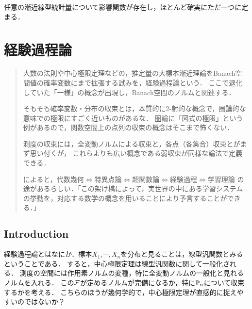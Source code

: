 \documentclass[uplatex,dvipdfmx]{jsreport}
\begin{document}
\begin{theorem}
    任意の漸近線型統計量について影響関数が存在し，ほとんど確実にただ一つに定まる．
\end{theorem}

\chapter{経験過程論}

\begin{quotation}
    大数の法則や中心極限定理などの，推定量の大標本漸近理論をBanach空間値の確率変数にまで拡張する試みを，経験過程論という．
    ここで退化していた「一様」の概念が出現し，Banach空間のノルムと関連する．

    そもそも確率変数・分布の収束とは，本質的に2-射的な概念で，圏論的な意味での極限にすごく近いものがあるな．
    圏論に「図式の極限」という例があるので，関数空間上の点列の収束の概念はそこまで怖くない．

    測度の収束には，全変動ノルムによる収束と，各点（各集合）収束とがまず思い付くが，
    これらよりも広い概念である弱収束が同様な論法で定義できる．

    \cite{渡辺澄夫}によると，代数幾何$\Leftrightarrow$特異点論$\Leftrightarrow$超関数論$\Leftrightarrow$経験過程$\Leftrightarrow$学習理論
    の途があるらしい．「この架け橋によって，実世界の中にある学習システムの挙動を，対応する数学の概念を用いることにより予言することができる．」
\end{quotation}

\section{Introduction}

\begin{tcolorbox}[colframe=ForestGreen, colback=ForestGreen!10!white,breakable,colbacktitle=ForestGreen!40!white,coltitle=black,fonttitle=\bfseries\sffamily,
title=経験過程論]
    経験過程論とはなにか．標本$X_1,\cdots,X_n$を分布と見ることは，線型汎関数とみるということである．
    すると，中心極限定理は線型汎関数に関して一般化される．
    測度の空間には作用素ノルムの変種，特に全変動ノルムの一般化と見れるノルムを入れる．
    この$\mathcal{F}$が定めるノルムが完備になるか，特に$\mathbb{P}_n$について収束するかを考える．
    こちらのほうが幾何学的で，中心極限定理が直感的に捉えやすいのではないか？
\end{tcolorbox}
\end{document}
